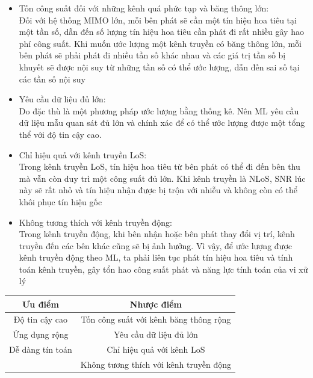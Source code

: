 \documentclass{article}
\begin{document}
\begin{itemize}

    \item {Tốn công suất đối với những kênh quá phức tạp và băng thông lớn:}\\ Đối với hệ thống MIMO lớn, mỗi bên phát sẽ cần một tín hiệu hoa tiêu tại một tần số, dẫn đến số lượng tín hiệu hoa tiêu cần phát đi rất nhiều gây hao phí công suất. Khi muốn ước lượng một kênh truyền có băng thông lớn, mỗi bên phát sẽ phải phát đi nhiều tần số khác nhau và các giá trị tần số bị khuyết sẽ được nội suy từ những tần số có thể ước lượng, dẫn đến sai số tại các tần số nội suy
    \item {Yêu cầu dữ liệu đủ lớn:}\\ Do đặc thù là một phương pháp ước lượng bằng thống kê. Nên ML yêu cầu dữ liệu mẫu quan sát đủ lớn và chính xác để có thể ước lượng được một tổng thể với độ tin cậy cao.
    \item Chỉ hiệu quả với kênh truyền LoS:\\ Trong kênh truyền LoS, tín hiệu hoa tiêu từ bên phát có thể đi đến bên thu mà vẫn còn duy trì một công suất đủ lớn. Khi kênh truyền là NLoS, SNR lúc này sẽ rất nhỏ và tín hiệu nhận được bị trộn với nhiễu và không còn có thể khôi phục tín hiệu gốc
    \item Không tương thích với kênh truyền động:\\ Trong kênh truyền động, khi bên nhận hoặc bên phát thay đổi vị trí, kênh truyền đến các bên khác cũng sẽ bị ảnh hưởng. Vì vậy, để ước lượng được kênh truyền động theo ML, ta phải liên tục phát tín hiệu hoa tiêu và tính toán kênh truyền, gây tổn hao công suất phát và năng lực tính toán của vi xử lý
\end{itemize}
\begin{center}
    \begin{tabular}{c|c}
    
     \textbf{Ưu điểm}&\textbf{Nhược điểm}\\ 
     \hline
     Độ tin cậy cao&Tốn công suất với kênh băng thông rộng\\
     Ứng dụng rộng & Yêu cầu dữ liệu đủ lớn\\
     Dễ dàng tín toán&Chỉ hiệu quả với kênh LoS\\
     &Không tương thích với kênh truyền động\\
\end{tabular}
\end{center}
\end{document}
